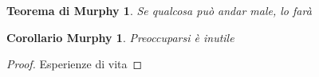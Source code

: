 \theoremstyle{plain}
\newtheorem{teoremaMurphy}{Teorema di Murphy}
\newtheorem{corollarioMurphy}{Corollario Murphy}

\begin{teoremaMurphy} Se qualcosa può andar male, lo farà \end{teoremaMurphy}
\begin{corollarioMurphy} Preoccuparsi è inutile \end{corollarioMurphy}
\begin{proof} Esperienze di vita \end{proof} %
